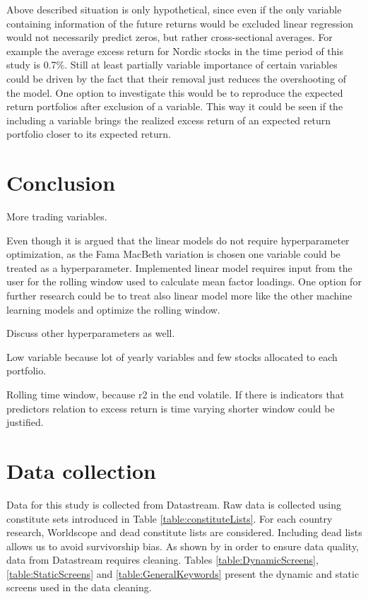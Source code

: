 \documentclass[12pt]{article}
\begin{document}
Above described situation is only hypothetical, since even if the only variable containing information of the future returns would be excluded linear regression would not necessarily predict zeros, but rather cross-sectional averages. For example the average excess return for Nordic stocks in the time period of this study is 0.7\%. Still at least partially variable importance of certain variables could be driven by the fact that their removal just reduces the overshooting of the model. One option to investigate this would be to reproduce the expected return portfolios after exclusion of a variable. This way it could be seen if the including a variable brings the realized excess return of an expected return portfolio closer to its expected return. \par

\section{Conclusion}\label{Conclusion}

More trading variables.

Even though it is argued that the linear models do not require hyperparameter optimization, as the Fama MacBeth variation is chosen one variable could be treated as a hyperparameter. Implemented linear model requires input from the user for the rolling window used to calculate mean factor loadings. One option for further research could be to treat also linear model more like the other machine learning models and optimize the rolling window.

Discuss other hyperparameters as well.

Low variable because lot of yearly variables and few stocks allocated to each portfolio.

Rolling time window, because r2 in the end volatile. If there is indicators that predictors relation to excess return is time varying shorter window could be justified.

\clearpage

\appendix
\section{Data collection}
\renewcommand{\thefigure}{A.\arabic{figure}}
\setcounter{figure}{0}
\renewcommand{\thetable}{A.\arabic{table}}
\setcounter{table}{0}

Data for this study is collected from Datastream. Raw data is collected using constitute sets introduced in Table \ref{table:constituteLists}. For each country research, Worldscope and dead constitute lists are considered. Including dead lists allows us to avoid survivorship bias. As shown by \citet{Ince2006} in order to ensure data quality, data from Datastream requires cleaning. Tables \ref{table:DynamicScreens}, \ref{table:StaticScreens} and \ref{table:GeneralKeywords} present the dynamic and static screens used in the data cleaning. \par
\end{document}
